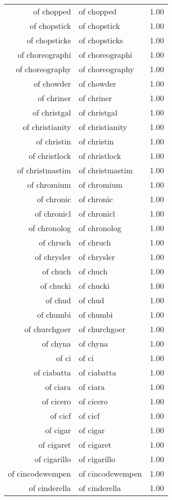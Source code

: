 \begin{table}[ht]
\begin{tabular}{rlr}
  of chopped & of chopped & 1.00 \\ 
  of chopstick & of chopstick & 1.00 \\ 
  of chopsticks & of chopsticks & 1.00 \\ 
  of choreographi & of choreographi & 1.00 \\ 
  of choreography & of choreography & 1.00 \\ 
  of chowder & of chowder & 1.00 \\ 
  of chriner & of chriner & 1.00 \\ 
  of christgal & of christgal & 1.00 \\ 
  of christianity & of christianity & 1.00 \\ 
  of christin & of christin & 1.00 \\ 
  of christlock & of christlock & 1.00 \\ 
  of christmastim & of christmastim & 1.00 \\ 
  of chromium & of chromium & 1.00 \\ 
  of chronic & of chronic & 1.00 \\ 
  of chronicl & of chronicl & 1.00 \\ 
  of chronolog & of chronolog & 1.00 \\ 
  of chruch & of chruch & 1.00 \\ 
  of chrysler & of chrysler & 1.00 \\ 
  of chuch & of chuch & 1.00 \\ 
  of chucki & of chucki & 1.00 \\ 
  of chud & of chud & 1.00 \\ 
  of chumbi & of chumbi & 1.00 \\ 
  of churchgoer & of churchgoer & 1.00 \\ 
  of chyna & of chyna & 1.00 \\ 
  of ci & of ci & 1.00 \\ 
  of ciabatta & of ciabatta & 1.00 \\ 
  of ciara & of ciara & 1.00 \\ 
  of cicero & of cicero & 1.00 \\ 
  of cicf & of cicf & 1.00 \\ 
  of cigar & of cigar & 1.00 \\ 
  of cigaret & of cigaret & 1.00 \\ 
  of cigarillo & of cigarillo & 1.00 \\ 
  of cincodewempen & of cincodewempen & 1.00 \\ 
  of cinderella & of cinderella & 1.00 \\ 

\end{tabular}
\end{table}
